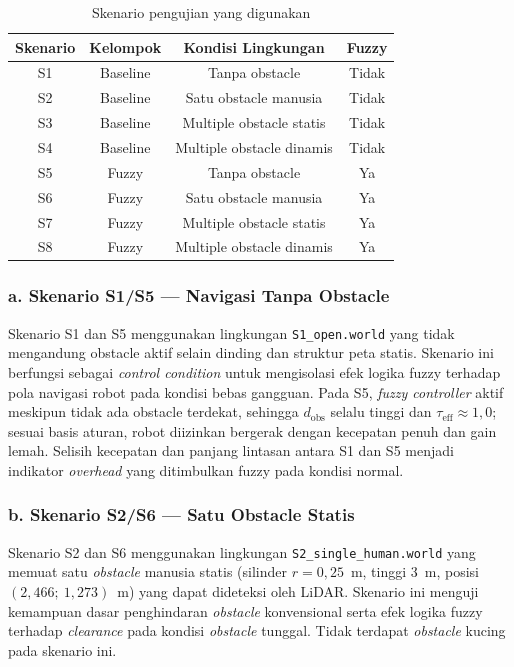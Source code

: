 \begin{table}[H]
\centering
\caption{Skenario pengujian yang digunakan}
\label{tab:skenario_pengujian}
\begin{tabular}{cccc}
\toprule
\textbf{Skenario} &
\textbf{Kelompok} &
\textbf{Kondisi Lingkungan} &
\textbf{Fuzzy} \\
\midrule
S1 & Baseline & Tanpa obstacle & Tidak \\
S2 & Baseline & Satu obstacle manusia & Tidak \\
S3 & Baseline & Multiple obstacle statis & Tidak \\
S4 & Baseline & Multiple obstacle dinamis & Tidak \\
S5 & Fuzzy & Tanpa obstacle & Ya \\
S6 & Fuzzy & Satu obstacle manusia & Ya \\
S7 & Fuzzy & Multiple obstacle statis & Ya \\
S8 & Fuzzy & Multiple obstacle dinamis & Ya \\
\bottomrule
\end{tabular}
\end{table}

\subsubsection*{a. Skenario S1/S5 --- Navigasi Tanpa Obstacle}

Skenario S1 dan S5 menggunakan lingkungan \texttt{S1\_open.world} yang tidak mengandung obstacle aktif selain dinding dan struktur peta statis. Skenario ini berfungsi sebagai \textit{control condition} untuk mengisolasi efek logika fuzzy terhadap pola navigasi robot pada kondisi bebas gangguan. Pada S5, \textit{fuzzy controller} aktif meskipun tidak ada obstacle terdekat, sehingga $d_\text{obs}$ selalu tinggi dan $\tau_\text{eff} \approx 1{,}0$; sesuai basis aturan, robot diizinkan bergerak dengan kecepatan penuh dan gain lemah. Selisih kecepatan dan panjang lintasan antara S1 dan S5 menjadi indikator \textit{overhead} yang ditimbulkan fuzzy pada kondisi normal.

\subsubsection*{b. Skenario S2/S6 --- Satu Obstacle Statis}

Skenario S2 dan S6 menggunakan lingkungan \texttt{S2\_single\_human.world} yang memuat satu \textit{obstacle} manusia statis (silinder $r = 0{,}25$~m, tinggi 3~m, posisi $(2{,}466;\ 1{,}273)$~m) yang dapat dideteksi oleh LiDAR. Skenario ini menguji kemampuan dasar penghindaran \textit{obstacle} konvensional serta efek logika fuzzy terhadap \textit{clearance} pada kondisi \textit{obstacle} tunggal. Tidak terdapat \textit{obstacle} kucing pada skenario ini.

